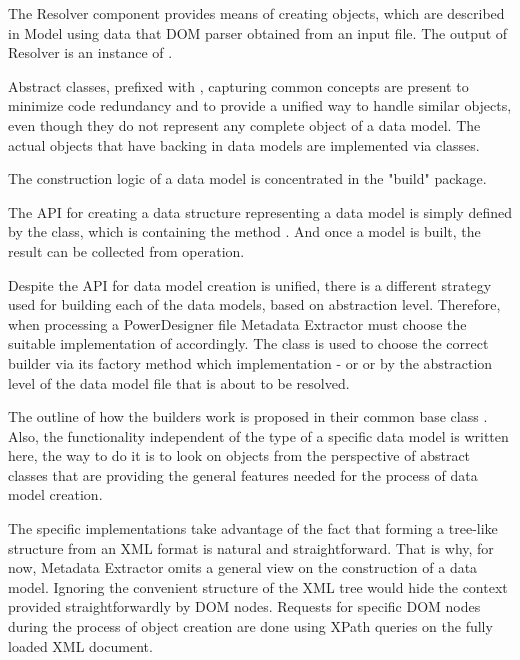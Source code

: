 The Resolver component provides means of creating objects, which are described in Model using data that DOM parser obtained from an input file. The output of Resolver is an instance of .

Abstract classes, prefixed with , capturing common concepts are present to minimize code redundancy and to provide a unified way to handle similar objects, even though they do not represent any complete object of a data model. 
The actual objects that have backing in data models are implemented via  classes.

The construction logic of a data model is concentrated in the "build" package.

The API for creating a data structure representing a data model is simply defined by the   class, which is containing the method . And once a model is built, the result can be collected from  operation.

Despite the API for data model creation is unified, there is a different strategy used for building each of the data models, based on abstraction level. 
Therefore, when processing a PowerDesigner file Metadata Extractor must choose the suitable implementation of  accordingly. 
The class  is used to choose the correct builder via its factory method which implementation -  or  or  by the abstraction level of the data model file that is about to be resolved.

The outline of how the builders work is proposed in their common base class . 
Also, the functionality independent of the type of a specific data model is written here, the way to do it is to look on objects from the perspective of abstract classes that are providing the general features needed for the process of data model creation.

The specific implementations take advantage of the fact that forming a tree-like structure from an XML format is natural and straightforward. That is why, for now, Metadata Extractor omits a general view on the construction of a data model. Ignoring the convenient structure of the XML tree would hide the context provided straightforwardly by DOM nodes. 
Requests for specific DOM nodes during the process of object creation are done using XPath queries on the fully loaded XML document.


